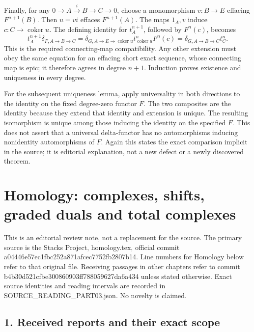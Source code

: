 \documentclass[11pt]{article}
\begin{document}
Finally, for any \(0\to A\xrightarrow{i}B\to C\to0\), choose a monomorphism \(v:B\to E\) effacing \(F^{n+1}(B)\). Then \(u=vi\) effaces \(F^{n+1}(A)\). The maps \(1_A,v\) induce \(c:C\to\operatorname{coker}u\). The defining identity for \(t_A^{n+1}\), followed by \(F^n(c)\), becomes \[
t_A^{n+1}\delta_{F,A\to B\to C}
=\delta_{G,A\to E\to\operatorname{coker}u}
 t_{\operatorname{coker}u}^nF^n(c)
=\delta_{G,A\to B\to C}t_C^n.
\] This is the required connecting-map compatibility. Any other extension must obey the same equation for an effacing short exact sequence, whose connecting map is epic; it therefore agrees in degree \(n+1\). Induction proves existence and uniqueness in every degree.

For the subsequent uniqueness lemma, apply universality in both directions to the identity on the fixed degree-zero functor \(F\). The two composites are the identity because they extend that identity and extension is unique. The resulting isomorphism is unique among those inducing the identity on the specified \(F\). This does not assert that a universal delta-functor has no automorphisms inducing nonidentity automorphisms of \(F\). Again this states the exact comparison implicit in the source; it is editorial explanation, not a new defect or a newly discovered theorem.
\clearpage
\section{Homology: complexes, shifts, graded duals and total complexes}\label{note-03-homology-complexes-shifts-graded-duals-and-total-complexes}

This is an editorial review note, not a replacement for the source. The primary source is the Stacks Project, homology.tex, official commit a04446e5\allowbreak{}7ec1fbc2\allowbreak{}52a871af\allowbreak{}cec7752f\allowbreak{}b2807b14. Line numbers for Homology below refer to that original file. Receiving passages in other chapters refer to commit b4b30d52\allowbreak{}1cfbe300\allowbreak{}860903ff\allowbreak{}78805962\allowbreak{}7da6a434 unless stated otherwise. Exact source identities and reading intervals are recorded in SOURCE\_READING\_PART03.json. No novelty is claimed.

\subsection{1. Received reports and their exact scope}\label{note-03-received-reports-and-their-exact-scope}
\end{document}
